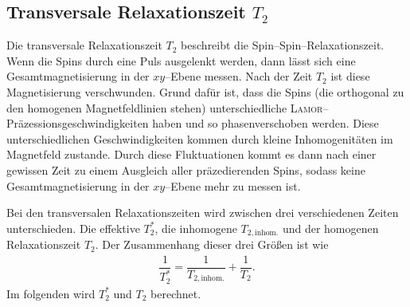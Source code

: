 \documentclass[10pt]{article}
\begin{document}
\begin{multicols}{2}
\subsection{Transversale Relaxationszeit $T_2$}
Die transversale Relaxationszeit $T_2$ beschreibt die Spin--Spin--Relaxationszeit.
Wenn die Spins durch eine Puls ausgelenkt werden, dann lässt sich eine Gesamtmagnetisierung in der $xy$--Ebene messen.
Nach der Zeit $T_2$ ist diese Magnetisierung verschwunden.
Grund dafür ist, dass die Spins (die orthogonal zu den homogenen Magnetfeldlinien stehen) unterschiedliche \textsc{Lamor}--Präzessionsgeschwindigkeiten haben und so phasenverschoben werden.
Diese unterschiedlichen Geschwindigkeiten kommen durch kleine Inhomogenitäten im Magnetfeld zustande.
Durch diese Fluktuationen kommt es dann nach einer gewissen Zeit zu einem Ausgleich aller präzedierenden Spins, sodass keine Gesamtmagnetisierung in der $xy$--Ebene mehr zu messen ist.

Bei den transversalen Relaxationszeiten wird zwischen drei verschiedenen Zeiten unterschieden.
Die effektive $T_2^*$, die inhomogene $T_{2,\text{inhom.}}$ und der homogenen Relaxationszeit $T_2$.
Der Zusammenhang dieser drei Größen ist wie
\begin{align} 
        \dfrac{1}{T_2^*}=\dfrac{1}{T_{2,\text{inhom.}}}+\dfrac{1}{T_2}
.\end{align} 
Im folgenden wird $T_2^*$ und $T_2$ berechnet.


\end{multicols}
\end{document}
